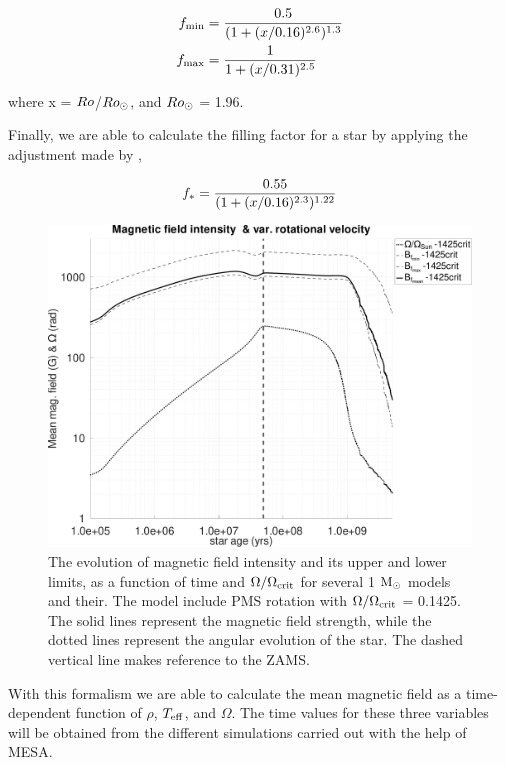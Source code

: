 \documentclass[fleqn,usenatbib]{mnras}
\begin{document}
\begin{ceqn}
\begin{align}
     f_{\mathrm{min}} &= \frac{0.5}{(1+(x/0.16)^{2.6})^{1.3}} \label{eq:fmin}\\
     f_{\mathrm{max}} &= \frac{1}{1+(x/0.31)^{2.5}} \label{eq:fmax}
\end{align}
\end{ceqn}
where x = $Ro$/$Ro_\odot$, and $Ro_\odot$ = 1.96.


Finally, we are able to calculate the filling factor for a star by applying the adjustment made by \cite{Gallet2013},
\begin{ceqn}
\begin{equation}
     f_{\mathrm{*}} = \frac{0.55}{(1+(x/0.16)^{2.3})^{1.22}} \label{eq:fstart}
\end{equation}
\end{ceqn}

\begin{figure}
	\includegraphics[clip,width=\columnwidth]{figures/paper2/mag_field_limits_var_vel_g3.pdf}
    \caption{The evolution of magnetic field intensity and its upper and lower limits, as a function of time and $\Omega / \Omega_{\mathrm{crit}}$ for several 1 $\mathrm{M}_\odot$ models and their. The model include PMS rotation with $\Omega / \Omega_{\mathrm{crit}}$ = 0.1425. The solid lines represent the magnetic field strength, while the dotted lines represent the angular evolution of the star. The dashed vertical line makes reference to the ZAMS.}
    \label{fig:mag_field_limits_var_vel_g3}
\end{figure}

With this formalism we are able to calculate the mean magnetic field as a time-dependent function of $\rho$, $T_{\mathrm{eff}}$, and $\Omega$. The time values for these three variables will be obtained from the different simulations carried out with the help of MESA.
\end{document}

